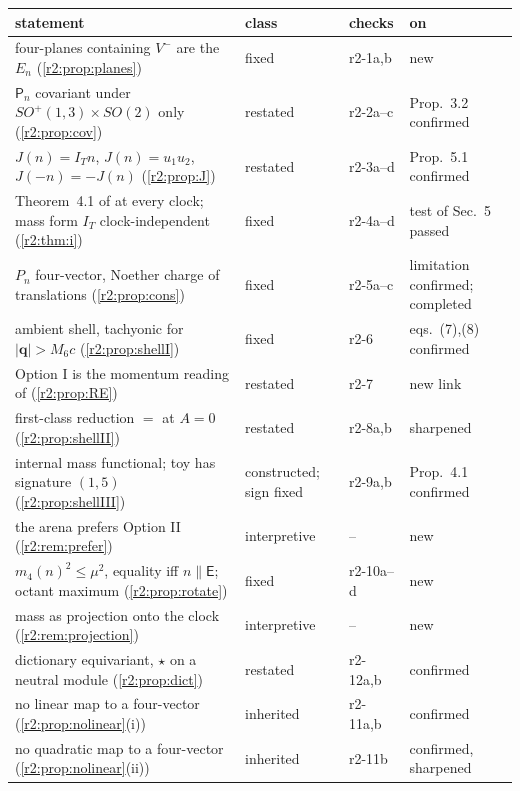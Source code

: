 {\small
\renewcommand{\arraystretch}{1.12}
\begin{longtable}{@{}>{\raggedright\arraybackslash}p{6.9cm}>{\raggedright\arraybackslash}p{2.1cm}>{\raggedright\arraybackslash}p{1.9cm}>{\raggedright\arraybackslash}p{3.0cm}@{}}
\toprule
statement & class & checks & on \cite{FMB}\\
\midrule
\endhead
four-planes containing $V^-$ are the $E_n$ (\cref{r2:prop:planes}) & fixed & r2-1a,b & new\\
$\mathsf P_n$ covariant under $SO^+(1,3)\times SO(2)$ only (\cref{r2:prop:cov}) & restated & r2-2a--c & Prop.~3.2 confirmed\\
$J(n)=I_Tn$, $J(n)=u_1u_2$, $J(-n)=-J(n)$ (\cref{r2:prop:J}) & restated & r2-3a--d & Prop.~5.1 confirmed\\
Theorem~4.1 of \cite{ES17} at every clock; mass form $I_T$ clock-independent (\cref{r2:thm:i}) & fixed & r2-4a--d & test of Sec.~5 passed\\
$P_n$ four-vector, Noether charge of translations (\cref{r2:prop:cons}) & fixed & r2-5a--c & limitation confirmed; completed\\
ambient shell, tachyonic for $|\mathbf q|>M_6c$ (\cref{r2:prop:shellI}) & fixed & r2-6 & eqs.~(7),(8) confirmed\\
Option I is the momentum reading of \cite{RE} (\cref{r2:prop:RE}) & restated & r2-7 & new link\\
first-class reduction $=$ \cite[Thm.~30.1]{ES17} at $A=0$ (\cref{r2:prop:shellII}) & restated & r2-8a,b & sharpened\\
internal mass functional; toy has signature $(1,5)$ (\cref{r2:prop:shellIII}) & constructed; sign fixed & r2-9a,b & Prop.~4.1 confirmed\\
the arena prefers Option II (\cref{r2:rem:prefer}) & interpretive & -- & new\\
$m_4(n)^2\le\mu^2$, equality iff $n\parallel\boldsymbol{\mathsf E}$; octant maximum (\cref{r2:prop:rotate}) & fixed & r2-10a--d & new\\
mass as projection onto the clock (\cref{r2:rem:projection}) & interpretive & -- & new\\
dictionary equivariant, $\star$ on a neutral module (\cref{r2:prop:dict}) & restated & r2-12a,b & confirmed\\
no linear map to a four-vector (\cref{r2:prop:nolinear}(i)) & inherited & r2-11a,b & confirmed\\
no quadratic map to a four-vector (\cref{r2:prop:nolinear}(ii)) & inherited & r2-11b & confirmed, sharpened\\

\end{longtable}}
